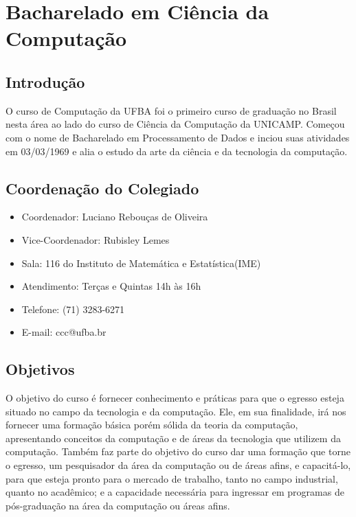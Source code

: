 \section{Bacharelado em Ciência da Computação} 

	\subsection{Introdução}
	O curso de Computação da UFBA foi o primeiro curso de graduação no Brasil nesta área ao lado do curso de Ciência da Computação da UNICAMP. Começou com o nome de Bacharelado em Processamento de Dados e inciou suas atividades em 03/03/1969 e alia o estudo da arte da ciência e da tecnologia da computação.

	\subsection{Coordenação do Colegiado}
    \begin{itemize}
        \item  Coordenador: Luciano Rebouças de Oliveira
        \item  Vice-Coordenador: Rubisley Lemes
        \item  Sala: 116 do Instituto de Matemática e Estatística(IME)
        \item  Atendimento: Terças e Quintas 14h às 16h
        \item Telefone: (71) 3283-6271
        \item E-mail: ccc@ufba.br
    \end{itemize}
    
    \subsection{Objetivos}
    O objetivo do curso é fornecer conhecimento e práticas para que o egresso esteja situado no campo da tecnologia e da computação. Ele, em sua finalidade, irá nos fornecer uma formação básica porém sólida da teoria da computação, apresentando conceitos da computação e de áreas da tecnologia que utilizem da computação. Também faz parte do objetivo do curso dar uma formação que torne o egresso, um pesquisador da área da computação ou de áreas afins, e capacitá-lo, para que esteja pronto para o mercado de trabalho, tanto no campo industrial, quanto no acadêmico; e a capacidade necessária para ingressar em programas de pós-graduação na área da computação ou áreas afins.
    
